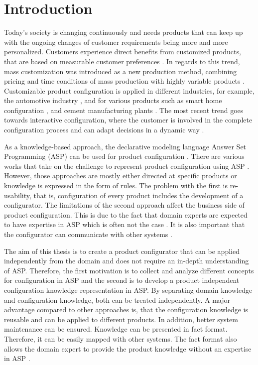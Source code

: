 \section{Introduction}\label{sec:introduction}
Today's society is changing continuously and needs products that can keep up with the ongoing changes of customer requirements being more and more personalized. 
Customers experience direct benefits from customized products, that are based on measurable customer preferences \cite{frkest09}. 
In regards to this trend, mass customization was introduced as a new production method, combining pricing and time conditions of mass production with highly variable products \cite{felfernig07}. 
Customizable product configuration is applied in different industries, for example, the automotive industry \cite{tiheanso13}, and for various products such as smart home configuration \cite{fefaateruraz17a}, and cement manufacturing plants \cite{orsben14}. 
The most recent trend goes towards interactive configuration, where the customer is involved in the complete configuration process and can adapt decisions in a dynamic way \cite{fahakrscscta20a}.\newline

As a knowledge-based approach, the declarative modeling language Answer Set Programming (ASP) can be used for product configuration \cite{gerysc15a}. 
There are various works that take on the challenge to represent product configuration using ASP \cite{fefaateruraz17a} \cite{mytirafe14a} \cite{gekakasc11d}. 
However, those approaches are mostly either directed at specific products or knowledge is expressed in the form of rules. 
The problem with the first is re-usability, that is, configuration of every product includes the development of a configurator.
The limitations of the second approach affect the business side of product configuration. 
This is due to the fact that domain experts are expected to have expertise in ASP which is often not the case \cite{zhang14a}. 
It is also important that the configurator can communicate with other systems \cite{fefrjastza03a}. \newline   

The aim of this thesis is to create a product configurator that can be applied independently from the domain and does not require an in-depth understanding of ASP. 
Therefore, the first motivation is to collect and analyze different concepts for configuration in ASP and the second is to develop a product independent configuration knowledge representation in ASP. 
By separating domain knowledge and configuration knowledge, both can be treated independently. 
A major advantage compared to other approaches is, that the configuration knowledge is reusable and can be applied to different products. 
In addition, better system maintenance can be ensured.
Knowledge can be presented in fact format.
Therefore, it can be easily mapped with other systems. 
The fact format also allows the domain expert to provide the product knowledge without an expertise in ASP \cite{zhang14a}. \newline

